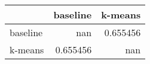 \begin{tabular}{lrr}
\toprule
          &   baseline &    k-means \\
\midrule
 baseline & nan        &   0.655456 \\
 k-means  &   0.655456 & nan        \\
\bottomrule
\end{tabular}